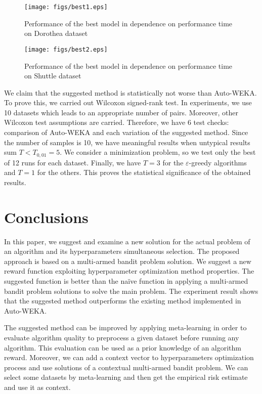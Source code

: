 \documentclass{svproc}
\begin{document}
\begin{figure}
\vspace{2.5cm}
\texttt{[image: figs/best1.eps]}
\caption{Performance of the best model in dependence on performance time on Dorothea dataset}
\end{figure}

\begin{figure}
\vspace{2.5cm}
\texttt{[image: figs/best2.eps]}
\caption{Performance of the best model in dependence on performance time on Shuttle dataset}
\end{figure}


We claim that the suggested method is statistically not worse than Auto-WEKA. To prove this, we carried out Wilcoxon signed-rank test. In experiments, we use 10 datasets which leads to an appropriate number of pairs. Moreover, other Wilcoxon test assumptions are carried. Therefore, we have 6 test checks: comparison of Auto-WEKA and each variation of the suggested method. Since the number of samples is 10, we have meaningful results when untypical results sum $T < T_{0,01} = 5$. We consider a minimization problem, so we test only the best of 12 runs for each dataset. Finally, we have $T = 3$ for the $\varepsilon$-greedy algorithms and $T = 1$ for the others. This proves the statistical significance of the obtained results.

\section{Conclusions}
\label{sec:conclusion}

In this paper, we suggest and examine a new solution for the actual problem of an algorithm and its hyperparameters simultaneous selection. The proposed approach is based on a multi-armed bandit problem solution. We suggest a new reward function exploiting hyperparameter optimization method properties. The suggested function is better than the na\"ive function in applying a multi-armed bandit problem solutions to solve the main problem. The experiment result shows that the suggested method outperforms the existing method implemented in Auto-WEKA. 

The suggested method can be improved by applying meta-learning in order to evaluate algorithm quality to preprocess a given dataset before running any algorithm. This evaluation can be used as a prior knowledge of an algorithm reward. Moreover, we can add a context vector to hyperparameters optimization process and use solutions of a contextual multi-armed bandit problem. We can select some datasets by meta-learning and then get the empirical risk estimate and use it as context.
\end{document}
